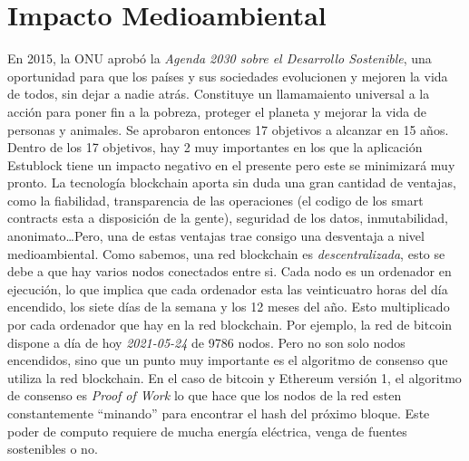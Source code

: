 \chapter{Impacto Medioambiental}
\label{cap:ImpactoMedioAmbiente}

En 2015, la ONU aprobó la \emph{Agenda 2030 sobre el Desarrollo Sostenible}\cite{agenda2030}, una oportunidad para que los países y sus sociedades evolucionen y mejoren la vida de todos, sin dejar a nadie atrás. Constituye un llamamaiento universal a la acción para poner fin a la pobreza, proteger el planeta y mejorar la vida de personas y animales. Se aprobaron entonces 17 objetivos\cite{17objetivos} a alcanzar en 15 años. \\

Dentro de los 17 objetivos, hay 2 muy importantes en los que la aplicación Estublock tiene un impacto negativo en el presente pero este se minimizará muy pronto. La tecnología blockchain aporta sin duda una gran cantidad de ventajas, como la fiabilidad, transparencia de las operaciones (el codigo de los smart contracts esta a disposición de la gente), seguridad de los datos, inmutabilidad, anonimato\dots Pero, una de estas ventajas trae consigo una desventaja a nivel medioambiental. Como sabemos, una red blockchain es \emph{descentralizada}, esto se debe a que hay varios nodos conectados entre si. Cada nodo es un ordenador en ejecución, lo que implica que cada ordenador esta las veinticuatro horas del día encendido, los siete días de la semana y los 12 meses del año. Esto multiplicado por cada ordenador que hay en la red blockchain. Por ejemplo, la red de bitcoin dispone a día de hoy \textit{2021-05-24} de 9786 nodos\cite{bitcoinNodos}. Pero no son solo nodos encendidos, sino que un punto muy importante es el algoritmo de consenso que utiliza la red blockchain. En el caso de bitcoin y Ethereum versión 1, el algoritmo de consenso es \emph{Proof of Work} lo que hace que los nodos de la red esten constantemente ``minando'' para encontrar el hash del próximo bloque. Este poder de computo requiere de mucha energía eléctrica, venga de fuentes sostenibles o no. \\

